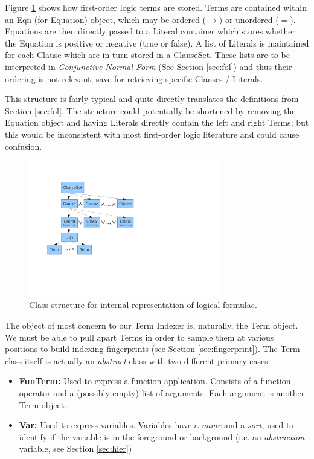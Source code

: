 Figure \ref{fig:expressions} shows how first-order logic terms are stored. Terms
are contained within an Eqn (for Equation) object, which may be ordered ($\to$)
or unordered ($=$). Equations are then directly passed to a Literal container
which stores whether the Equation is positive or negative (true or false). A list
of Literals is maintained for each Clause which are in turn stored in a ClauseSet.
These lists are to be interpreted in \emph{Conjunctive Normal Form} (See Section \ref{sec:fol})
and thus their ordering is not relevant; save for retrieving specific Clauses / Literals.

This structure is fairly typical and quite directly translates the definitions
from Section \ref{sec:fol}. The structure could potentially be shortened by
removing the Equation object and having Literals directly contain the left and right Terms;
but this would be inconsistent with most first-order logic literature and could cause confusion.

\begin{figure}[H]
  \centering
  \includegraphics[clip,trim=2.5cm 5cm 13cm 2cm,width=0.75\textwidth]{resources/logicstructure}
  \caption
   {Class structure for internal representation of logical formulae.}
   \label{fig:expressions}
\end{figure}

The object of most concern to our Term Indexer is, naturally, the Term object.
We must be able to pull apart Terms in order to sample them at various positions
to build indexing fingerprints (see Section \ref{sec:fingerprint}). The Term
class itself is actually an \emph{abstract} class with two different primary cases:
\begin{itemize}
\item[] \textbf{FunTerm:} Used to express a function application. Consists of
a function operator and a (possibly empty) list of arguments. Each argument
is another Term object.
\item[] \textbf{Var:} Used to express variables. Variables have a \emph{name}
and a \emph{sort}, used to identify if the variable is in the foreground
or background (i.e. an \emph{abstraction} variable, see Section \ref{sec:hier})
\end{itemize}

